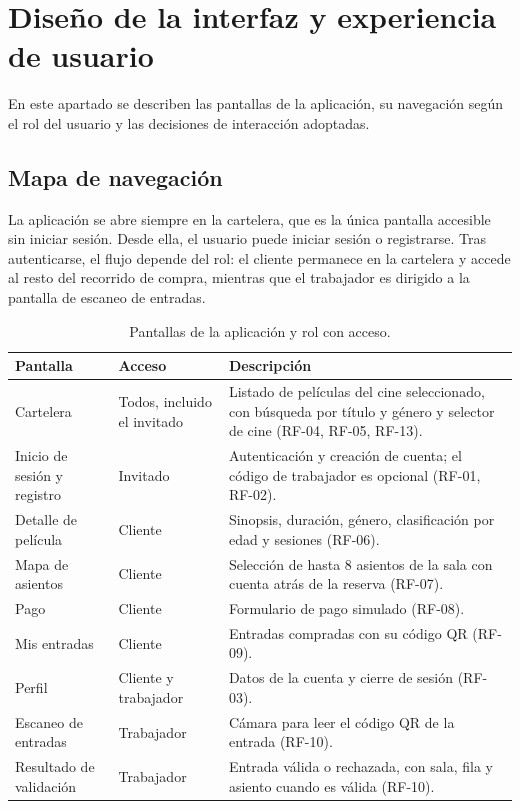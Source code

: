 \documentclass[11pt,a4paper]{article}
\begin{document}
\section{Diseño de la interfaz y experiencia de usuario}
En este apartado se describen las pantallas de la aplicación, su navegación según el rol del usuario y las decisiones de interacción adoptadas.

\subsection{Mapa de navegación}
La aplicación se abre siempre en la cartelera, que es la única pantalla accesible sin iniciar sesión. Desde ella, el usuario puede iniciar sesión o registrarse. Tras autenticarse, el flujo depende del rol: el cliente permanece en la cartelera y accede al resto del recorrido de compra, mientras que el trabajador es dirigido a la pantalla de escaneo de entradas.

\begin{table}[h!]
\centering
\begin{tabularx}{\textwidth}{L{3.6cm} L{3.4cm} Y}
\toprule
\textbf{Pantalla} & \textbf{Acceso} & \textbf{Descripción} \\
\midrule
Cartelera & Todos, incluido el invitado & Listado de películas del cine seleccionado, con búsqueda por título y género y selector de cine (RF-04, RF-05, RF-13). \\
Inicio de sesión y registro & Invitado & Autenticación y creación de cuenta; el código de trabajador es opcional (RF-01, RF-02). \\
Detalle de película & Cliente & Sinopsis, duración, género, clasificación por edad y sesiones (RF-06). \\
Mapa de asientos & Cliente & Selección de hasta 8 asientos de la sala con cuenta atrás de la reserva (RF-07). \\
Pago & Cliente & Formulario de pago simulado (RF-08). \\
Mis entradas & Cliente & Entradas compradas con su código QR (RF-09). \\
Perfil & Cliente y trabajador & Datos de la cuenta y cierre de sesión (RF-03). \\
Escaneo de entradas & Trabajador & Cámara para leer el código QR de la entrada (RF-10). \\
Resultado de validación & Trabajador & Entrada válida o rechazada, con sala, fila y asiento cuando es válida (RF-10). \\
\bottomrule
\end{tabularx}
\caption{Pantallas de la aplicación y rol con acceso.}
\end{table}
\end{document}
